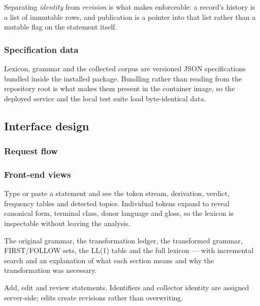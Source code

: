 Separating \emph{identity} from \emph{revision} is what makes  enforceable:
a record's history is a list of immutable rows, and publication is a pointer into that
list rather than a mutable flag on the statement itself.

\subsubsection*{Specification data}

Lexicon, grammar and the collected corpus are versioned JSON specifications bundled inside
the installed package. Bundling rather than reading from the repository root is what makes
them present in the container image, so the deployed service and the local test suite load
byte-identical data.

\subsection{Interface design}

\subsubsection*{Request flow}


\subsubsection*{Front-end views}

\begin{description}[leftmargin=1.4em, style=nextline, font=\bfseries]
  \item[Analyser]
    Type or paste a statement and see the token stream, derivation, verdict, frequency
    tables and detected topics. Individual tokens expand to reveal canonical form,
    terminal class, donor language and gloss, so the lexicon is inspectable without
    leaving the analysis.
  \item[Grammar explorer]
    The original grammar, the transformation ledger, the transformed grammar, FIRST/FOLLOW
    sets, the LL(1) table and the full lexicon --- with incremental search and an
    explanation of what each section means and why the transformation was necessary.
  \item[Corpus manager]
    Add, edit and review statements. Identifiers and collector identity are assigned
    server-side; edits create revisions rather than overwriting.
\end{description}

